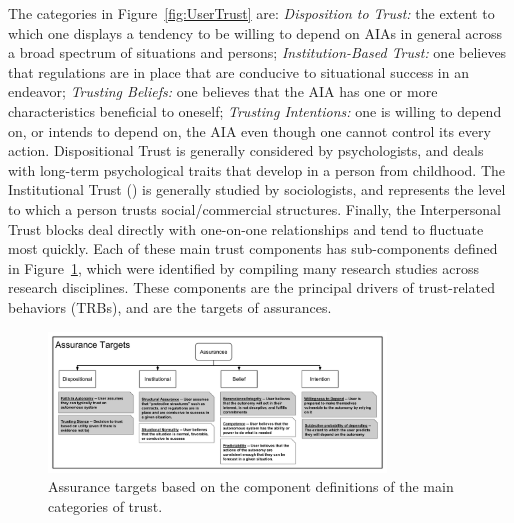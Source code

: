         The categories in Figure~\ref{fig:UserTrust} are: \textit{Disposition to Trust:} the extent to which one displays a tendency to be willing to depend on AIAs in general across a broad spectrum of situations and persons; \textit{Institution-Based Trust:} one believes that regulations are in place that are conducive to situational success in an endeavor; \textit{Trusting Beliefs:} one believes that the AIA has one or more characteristics beneficial to oneself; \textit{Trusting Intentions:} one is willing to depend on, or intends to depend on, the AIA even though one cannot control its every action. Dispositional Trust is generally considered by psychologists, and deals with long-term psychological traits that develop in a person from childhood. The Institutional Trust () is generally studied by sociologists, and represents the level to which a person trusts social/commercial structures. Finally, the Interpersonal Trust blocks deal directly with one-on-one relationships and tend to fluctuate most quickly. Each of these main trust components has sub-components defined in Figure~\ref{fig:Assurance_classes}, which were identified by compiling many research studies across research disciplines. These components are the principal drivers of trust-related behaviors (TRBs), and are the targets of assurances.

        \begin{figure}[htbp]
            \includegraphics[width=0.8\textwidth]{Figures/Assurances.pdf}%
            \caption{Assurance targets based on the component definitions of the main categories of trust.}
            \label{fig:Assurance_classes}
        \end{figure}
